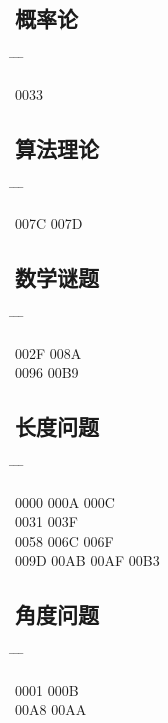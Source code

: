 \documentclass[twoside, twocolumn]{ctexart}
\newenvironment{problist}{
  \begin{center} \ttfamily \begin{tabbing}
      \hspace{50pt} \= \hspace{50pt} \= \hspace{50pt} \= \kill
  }{ \end{tabbing} \end{center} }
\begin{document}
  \subsection*{概率论}

  \begin{problist}
    0033   \\
  \end{problist}

  \subsection*{算法理论}

  \begin{problist}
    007C \> 007D \\
  \end{problist}

  \subsection*{数学谜题}

  \begin{problist}
    002F   \> 008A \\ 0096 \> 00B9 \\
  \end{problist}

  \subsection*{长度问题}

  \begin{problist}
    0000 \> 000A \> 000C  \\ 0031 \> 003F   \\
    0058 \> 006C \> 006F  \\ 009D \> 00AB \> 00AF \> 00B3 \\
  \end{problist}

  \subsection*{角度问题}

  \begin{problist}
    0001  \> 000B  \\ 00A8 \> 00AA \\
  \end{problist}
\end{document}
